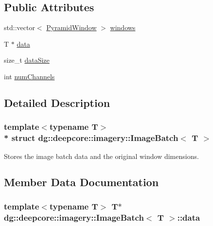 \subsection*{Public Attributes}
\begin{DoxyCompactItemize}
\item 
std\+::vector$<$ \hyperlink{structdg_1_1deepcore_1_1imagery_1_1_pyramid_window}{Pyramid\+Window} $>$ \hyperlink{classdg_1_1deepcore_1_1imagery_1_1_image_batch_aaad6b20c2ef1174aa8f76316de2f3346}{windows}
\item 
T $\ast$ \hyperlink{classdg_1_1deepcore_1_1imagery_1_1_image_batch_a796462f273b731f121263a3673c5c58c}{data}
\item 
size\+\_\+t \hyperlink{classdg_1_1deepcore_1_1imagery_1_1_image_batch_ab09934cee7a93fb7477e28f216fe33ac}{data\+Size}
\item 
int \hyperlink{classdg_1_1deepcore_1_1imagery_1_1_image_batch_a80cbef4587861d99294c5ca3ee0e7aec}{num\+Channels}
\end{DoxyCompactItemize}


\subsection{Detailed Description}
\subsubsection*{template$<$typename T$>$\\*
struct dg\+::deepcore\+::imagery\+::\+Image\+Batch$<$ T $>$}

Stores the image batch data and the original window dimensions. 

\subsection{Member Data Documentation}
\subsubsection[{\texorpdfstring{data}{data}}]{\setlength{\rightskip}{0pt plus 5cm}template$<$typename T$>$ T$\ast$ {\bf dg\+::deepcore\+::imagery\+::\+Image\+Batch}$<$ T $>$\+::data}\hypertarget{classdg_1_1deepcore_1_1imagery_1_1_image_batch_a796462f273b731f121263a3673c5c58c}{}\label{classdg_1_1deepcore_1_1imagery_1_1_image_batch_a796462f273b731f121263a3673c5c58c}
